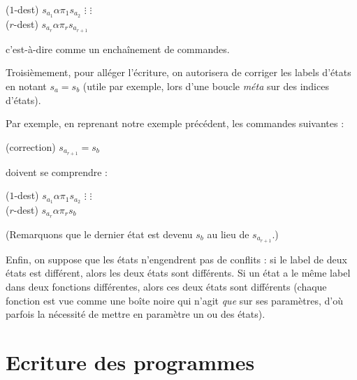 \begin{appendices}
			\espace
			
			\begin{algorithm}[H]
				($1$-dest) 	$s_{a_1} \alpha \pi_1 s_{a_{2}}$\;
				$\vdots$		\hspace{1cm} $\vdots$ \\
				($r$-dest) 	$s_{a_r} \alpha \pi_r s_{a_{r+1}}$\;
			\end{algorithm}
			
			\espace
			
			c'est-à-dire comme un enchaînement de commandes. 
			
			
			Troisièmement, pour alléger l'écriture, on autorisera de corriger les labels d'états en notant $s_a = s_b$ (utile par exemple, lors d'une boucle \emph{méta} sur des indices d'états).
			
			Par exemple, en reprenant notre exemple précédent, les commandes suivantes :
			
			\espace
			
			\begin{algorithm}[H]
				(correction)		$s_{a_{r+1}} = s_b$
			\end{algorithm}
			
			\espace
			
			doivent se comprendre :
			
			\espace
			
			\begin{algorithm}[H]
				($1$-dest) 	$s_{a_1} \alpha \pi_1 s_{a_{2}}$\;
				$\vdots$		\hspace{1cm} $\vdots$ \\
				($r$-dest) 	$s_{a_r} \alpha \pi_r s_{b}$\;
			\end{algorithm}
			
			\espace
			
			(Remarquons que le dernier état est devenu $s_b$ au lieu de $s_{a_{r+1}}$.)
			
			
			\espace
			
			
			Enfin, on suppose que les états n'engendrent pas de conflits : si le label de deux états est différent, alors les deux états sont différents. Si un état a le même label dans deux fonctions différentes, alors ces deux états sont différents (chaque fonction est vue comme une boîte noire qui n'agit \emph{que} sur ses paramètres, d'où parfois la nécessité de mettre en paramètre un ou des états).
		
		
		\section{Ecriture des programmes}
		\label{subsec:ecriture_programmes}
		

\end{appendices}
